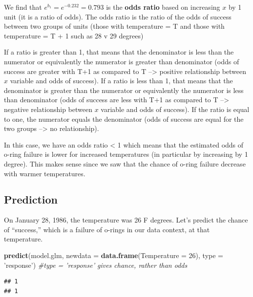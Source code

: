 \documentclass[]{book}
\newenvironment{Shaded}{\begin{snugshade}}{\end{snugshade}}
\newcommand{\CommentTok}[1]{\textcolor[rgb]{0.56,0.35,0.01}{\textit{#1}}}
\newcommand{\DataTypeTok}[1]{\textcolor[rgb]{0.13,0.29,0.53}{#1}}
\newcommand{\DecValTok}[1]{\textcolor[rgb]{0.00,0.00,0.81}{#1}}
\newcommand{\KeywordTok}[1]{\textcolor[rgb]{0.13,0.29,0.53}{\textbf{#1}}}
\newcommand{\NormalTok}[1]{#1}
\newcommand{\StringTok}[1]{\textcolor[rgb]{0.31,0.60,0.02}{#1}}
\begin{document}
We find that \(e^{b_1} = e^{-0.232} = 0.793\) is the \textbf{odds ratio} based on increasing \(x\) by 1 unit (it is a ratio of odds). The odds ratio is the ratio of the odds of success between two groups of units (those with temperature = T and those with temperature = T + 1 such as 28 v 29 degrees)

If a ratio is greater than 1, that means that the denominator is less than the numerator or equivalently the numerator is greater than denominator (odds of success are greater with T+1 as compared to T --\textgreater{} positive relationship between \(x\) variable and odds of success). If a ratio is less than 1, that means that the denominator is greater than the numerator or equivalently the numerator is less than denominator (odds of success are less with T+1 as compared to T --\textgreater{} negative relationship between \(x\) variable and odds of success). If the ratio is equal to one, the numerator equals the denominator (odds of success are equal for the two groups --\textgreater{} no relationship).

In this case, we have an odds ratio \textless{} 1 which means that the estimated odds of o-ring failure is lower for increased temperatures (in particular by increasing by 1 degree). This makes sense since we saw that the chance of o-ring failure decrease with warmer temperatures.

\hypertarget{prediction-1}{%
\subsection{Prediction}\label{prediction-1}}

On January 28, 1986, the temperature was 26 F degrees. Let's predict the chance of ``success,'' which is a failure of o-rings in our data context, at that temperature.

\begin{Shaded}
\begin{Highlighting}[]
\KeywordTok{predict}\NormalTok{(model.glm, }\DataTypeTok{newdata =} \KeywordTok{data.frame}\NormalTok{(}\DataTypeTok{Temperature =} \DecValTok{26}\NormalTok{), }\DataTypeTok{type =} \StringTok{'response'}\NormalTok{) }\CommentTok{#type = 'response' gives chance, rather than odds}
\end{Highlighting}
\end{Shaded}

\begin{verbatim}
## 1 
## 1
\end{verbatim}
\end{document}
